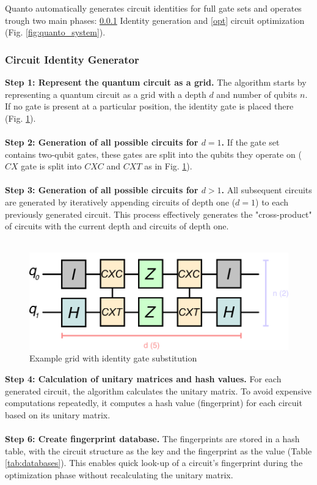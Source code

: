 Quanto automatically generates circuit identities for full gate sets and operates trough two main phases: \ref{gen} Identity generation and \ref{opt} circuit optimization (Fig. \ref{fig:quanto_system}).

\subsubsection{Circuit Identity Generator}
\label{gen}
\textbf{Step 1: Represent the quantum circuit as a grid.}
The algorithm starts by representing a quantum circuit as a grid with a depth $d$ and number of qubits $n$. If no gate is present at a particular position, the identity gate is placed there (Fig. \ref{fig:example_1}).
\\\\
\textbf{Step 2: Generation of all possible circuits for $d = 1$.}
If the gate set contains two-qubit gates, these gates are split into the qubits they operate on ($CX$ gate is split into $CXC$ and $CXT$ as in Fig. \ref{fig:example_1}).
\\\\
\textbf{Step 3: Generation of all possible circuits for $d > 1$.}
All subsequent circuits are generated by iteratively appending circuits of depth one ($d=1$) to each previously generated circuit. This process effectively generates the "cross-product" of circuits with the current depth and circuits of depth one.
\\\\
\begin{figure}
  \includegraphics[width=0.8\columnwidth]{assets/grid_example_2.png}
  \caption{Example grid with identity gate substitution}
  \label{fig:example_1}
\end{figure}
\textbf{Step 4: Calculation of unitary matrices and hash values.}
For each generated circuit, the algorithm calculates the unitary matrix. To avoid expensive computations repeatedly, it computes a hash value (fingerprint) for each circuit based on its unitary matrix.
\\\\
\textbf{Step 6: Create fingerprint database.}
The fingerprints are stored in a hash table, with the circuit structure as the key and the fingerprint as the value (Table \ref{tab:databases}). This enables quick look-up of a circuit’s fingerprint during the optimization phase without recalculating the unitary matrix.

